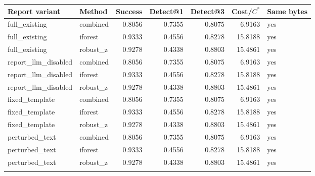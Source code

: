 \begin{tabular}{llrrrrl}
\toprule
Report variant & Method & Success & Detect@1 & Detect@3 & Cost/$C^*$ & Same bytes \\
\midrule
full\_existing & combined & 0.8056 & 0.7355 & 0.8075 & 6.9163 & yes \\
full\_existing & iforest & 0.9333 & 0.4556 & 0.8278 & 15.8188 & yes \\
full\_existing & robust\_z & 0.9278 & 0.4338 & 0.8803 & 15.4861 & yes \\
\addlinespace
report\_llm\_disabled & combined & 0.8056 & 0.7355 & 0.8075 & 6.9163 & yes \\
report\_llm\_disabled & iforest & 0.9333 & 0.4556 & 0.8278 & 15.8188 & yes \\
report\_llm\_disabled & robust\_z & 0.9278 & 0.4338 & 0.8803 & 15.4861 & yes \\
\addlinespace
fixed\_template & combined & 0.8056 & 0.7355 & 0.8075 & 6.9163 & yes \\
fixed\_template & iforest & 0.9333 & 0.4556 & 0.8278 & 15.8188 & yes \\
fixed\_template & robust\_z & 0.9278 & 0.4338 & 0.8803 & 15.4861 & yes \\
\addlinespace
perturbed\_text & combined & 0.8056 & 0.7355 & 0.8075 & 6.9163 & yes \\
perturbed\_text & iforest & 0.9333 & 0.4556 & 0.8278 & 15.8188 & yes \\
perturbed\_text & robust\_z & 0.9278 & 0.4338 & 0.8803 & 15.4861 & yes \\
\addlinespace
\bottomrule
\end{tabular}
